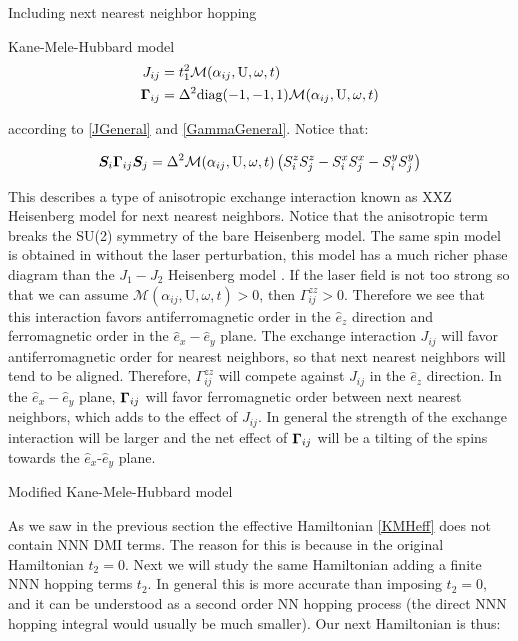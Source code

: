 \begin{section}{Including next nearest neighbor hopping}
\begin{subsection}{Kane-Mele-Hubbard model}
\begin{align*}
J_{ij} &= t_1^2\mathcal{M}(\alpha_{ij}, \text{U}, \omega, t) \\
\boldsymbol{\Gamma}_{ij} &= \Delta^2 \text{diag}(-1,-1,1)\mathcal{M}(\alpha_{ij}, \text{U}, \omega, t)
\end{align*}

according to \ref{JGeneral} and \ref{GammaGeneral}. Notice that:

\begin{equation*}
\boldsymbol{S}_i \boldsymbol{\Gamma}_{ij} \boldsymbol{S}_j = \Delta^2 \mathcal{M}(\alpha_{ij}, \text{U}, \omega, t) \left(S_i^zS_j^z - S_i^xS_j^x - S_i^yS_j^y\right)
\end{equation*}

This describes a type of anisotropic exchange interaction known as XXZ Heisenberg model for next nearest neighbors. Notice that the anisotropic term breaks the SU(2) symmetry of the bare Heisenberg model. The same spin model is obtained in \cite{Rachel2010} without the laser perturbation, this model has a much richer phase diagram than the $J_1-J_2$ Heisenberg model \cite{Vaezi2012}. If the laser field is not too strong so that we can assume $\mathcal{M}(\alpha_{ij}, \text{U}, \omega, t) > 0$, then $\Gamma^{zz}_{ij} > 0$. Therefore we see that this interaction favors antiferromagnetic order in the $\hat{e}_z$ direction and ferromagnetic order in the $\hat{e}_x-\hat{e}_y$ plane. The exchange interaction $J_{ij}$ will favor antiferromagnetic order for nearest neighbors, so that next nearest neighbors will tend to be aligned. Therefore, $\Gamma^{zz}_{ij}$ will compete against $J_{ij}$ in the $\hat{e}_z$ direction. In the $\hat{e}_x-\hat{e}_y$ plane, $\boldsymbol{\Gamma}_{ij}$ will favor ferromagnetic order between next nearest neighbors, which adds to the effect of $J_{ij}$. In general the strength of the exchange interaction will be larger and the net effect of $\boldsymbol{\Gamma}_{ij}$ will be a tilting of the spins towards the $\hat{e}_x$-$\hat{e}_y$ plane.

\end{subsection}

\begin{subsection}{Modified Kane-Mele-Hubbard model}

As we saw in the previous section the effective Hamiltonian \ref{KMHeff} does not contain NNN DMI terms. The reason for this is because in the original Hamiltonian $t_2 = 0$. Next we will study the same Hamiltonian adding a finite NNN hopping terms $t_2$. In general this is more accurate than imposing $t_2 = 0$, and it can be understood as a second order NN hopping process (the direct NNN hopping integral would usually be much smaller). Our next Hamiltonian is thus:


\end{subsection}
\end{section}
